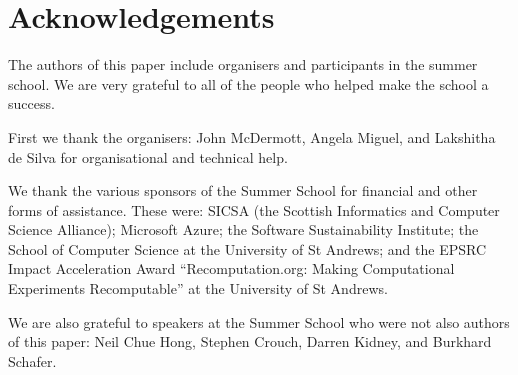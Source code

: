\section*{Acknowledgements}
\label{s:ack}

The authors of this paper include organisers and participants in the
summer school. We are very grateful to all of the people who helped
make the school a success.

First we thank the organisers: John McDermott, Angela Miguel, and Lakshitha de Silva for organisational and technical help.

We thank the various sponsors of the Summer School  for financial and other forms of assistance.
These were: SICSA (the Scottish Informatics and Computer Science Alliance); 
Microsoft Azure; the Software Sustainability Institute; 
the School of Computer Science at the University of St Andrews; 
and the EPSRC Impact Acceleration Award ``Recomputation.org: Making
Computational Experiments Recomputable''
at the University of St Andrews.

We are also grateful to speakers at the Summer School who were not also authors of this paper: 
Neil Chue Hong,
Stephen Crouch, 
Darren Kidney, and
Burkhard Schafer.

